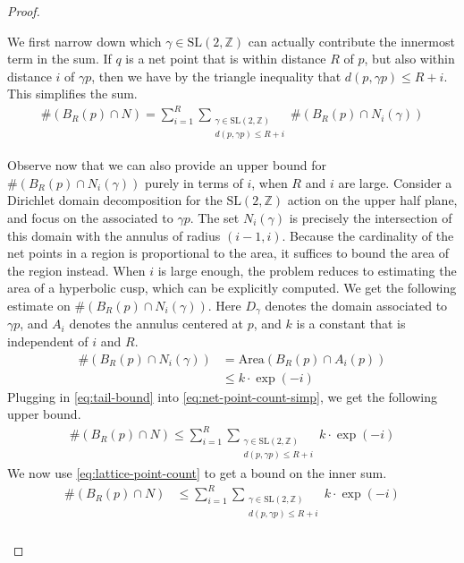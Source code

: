 \documentclass[12pt, reqno]{amsart}
\begin{document}
\begin{proof}
\begin{itemize}
    We first narrow down which $\gamma \in \mathrm{SL}(2, \mathbb{Z})$ can actually contribute the innermost term in the sum.
    If $q$ is a net point that is within distance $R$ of $p$, but also within distance $i$ of $\gamma p$, then we have by the triangle inequality that $d(p, \gamma p) \leq R + i$.
    This simplifies the sum.
    \begin{align}
      \#\left( B_R(p) \cap N \right) = \sum_{i=1}^R \sum_{\substack{\gamma \in \mathrm{SL}(2, \mathbb{Z}) \\ d(p, \gamma p) \leq R+i}} \#\left( B_R(p) \cap N_i(\gamma) \right) \label{eq:net-point-count-simp}
    \end{align}

    Observe now that we can also provide an upper bound for $\#\left( B_R(p) \cap N_i(\gamma) \right)$ purely in terms of $i$, when $R$ and $i$ are large.
    Consider a Dirichlet domain decomposition for the $\mathrm{SL}(2, \mathbb{Z})$ action on the upper half plane, and focus on the associated to $\gamma p$.
    The set $N_i(\gamma)$ is precisely the intersection of this domain with the annulus of radius $(i-1, i)$.
    Because the cardinality of the net points in a region is proportional to the area, it suffices to bound the area of the region instead.
    When $i$ is large enough, the problem reduces to estimating the area of a hyperbolic cusp, which can be explicitly computed.
    We get the following estimate on $\#\left( B_R(p) \cap N_i(\gamma) \right)$.
    Here $D_{\gamma}$ denotes the domain associated to $\gamma p$, and $A_i$ denotes the annulus centered at $p$, and $k$ is a constant that is independent of $i$ and $R$.
    \begin{align}
      \#\left( B_R(p) \cap N_i(\gamma) \right) &= \mathrm{Area}\left( B_R(p) \cap A_i(p) \right) \\
                                               &\leq k \cdot \exp(-i) \label{eq:tail-bound}
    \end{align}
    Plugging in \eqref{eq:tail-bound} into \eqref{eq:net-point-count-simp}, we get the following upper bound.
    \begin{align*}
      \#\left( B_R(p) \cap N \right) \leq \sum_{i=1}^R \sum_{\substack{\gamma \in \mathrm{SL}(2, \mathbb{Z}) \\ d(p, \gamma p) \leq R+i}} k \cdot \exp(-i)
    \end{align*}
    We now use \eqref{eq:lattice-point-count} to get a bound on the inner sum.
    \begin{align*}
      \#\left( B_R(p) \cap N \right) &\leq \sum_{i=1}^R \sum_{\substack{\gamma \in \mathrm{SL}(2, \mathbb{Z}) \\ d(p, \gamma p) \leq R+i}} k \cdot \exp(-i) \\

\end{align*}
\end{itemize}
\end{proof}
\end{document}
